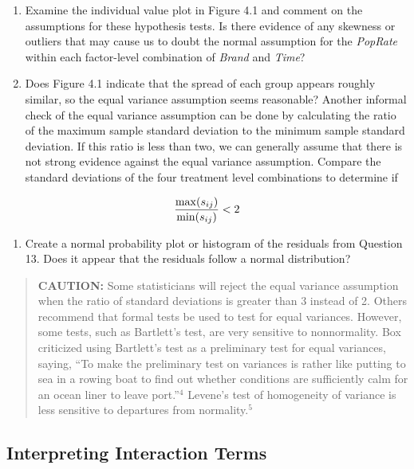 \documentclass[
]{report}
\providecommand{\tightlist}{%
  \setlength{\itemsep}{0pt}\setlength{\parskip}{0pt}}
\begin{document}
\begin{enumerate}
\def\labelenumi{(\alph{enumi})}
\tightlist
\item
  Examine the individual value plot in Figure 4.1 and comment on the assumptions for these hypothesis tests. Is there evidence of any skewness or outliers that may cause us to doubt the normal assumption for the \emph{PopRate} within each factor-level combination of \emph{Brand} and \emph{Time}?
\item
  Does Figure 4.1 indicate that the spread of each group appears roughly similar, so the equal variance assumption seems reasonable? Another informal check of the equal variance assumption can be done by calculating the ratio of the maximum sample standard deviation to the minimum sample standard deviation. If this ratio is less than two, we can generally assume that there is not strong evidence against the equal variance assumption. Compare the standard deviations of the four treatment level combinations to determine if
\end{enumerate}

\begin{align}
\frac{\max(s_{ij})}{\min(s_{ij})} < 2
\notag
\end{align}

\begin{enumerate}
\def\labelenumi{(\alph{enumi})}
\setcounter{enumi}{2}
\tightlist
\item
  Create a normal probability plot or histogram of the residuals from Question 13. Does it appear that the residuals follow a normal distribution?
\end{enumerate}

\begin{quote}
\textbf{CAUTION:} Some statisticians will reject the equal variance assumption when the ratio of standard deviations is greater than 3 instead of 2. Others recommend that formal tests be used to test for equal variances. However, some tests, such as Bartlett's test, are very sensitive to nonnormality. Box criticized using Bartlett's test as a preliminary test for equal variances, saying, ``To make the preliminary test on variances is rather like putting to sea in a rowing boat to find out whether conditions are sufficiently calm for an ocean liner to leave port.''\(^4\) Levene's test of homogeneity of variance is less sensitive to departures from normality.\(^5\)
\end{quote}

\hypertarget{interpreting-interaction-terms}{%
\subsection*{Interpreting Interaction Terms}\label{interpreting-interaction-terms}}
\end{document}
